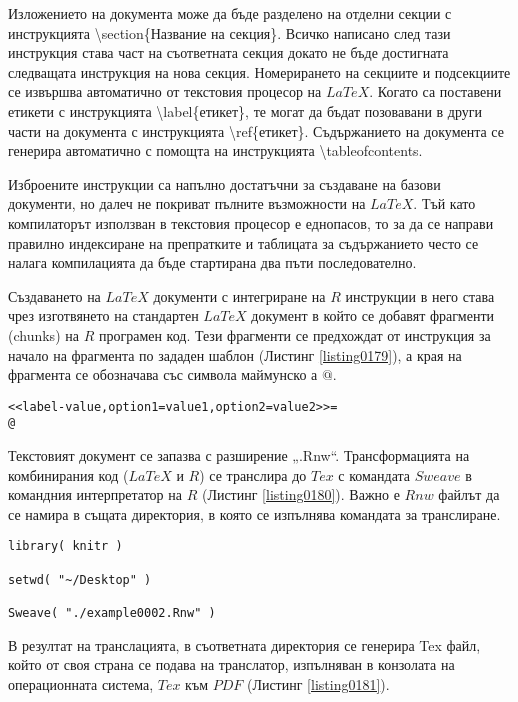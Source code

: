 Изложението на документа може да бъде разделено на отделни секции с инструкцията \textbackslash section\{Название на секция\}. Всичко написано след тази инструкция става част на съответната секция докато не бъде достигната следващата инструкция на нова секция. Номерирането на секциите и подсекциите се извършва автоматично от текстовия процесор на $LaTeX$. Когато са поставени етикети с инструкцията \textbackslash label\{етикет\}, те могат да бъдат позовавани в други части на документа с инструкцията \textbackslash ref\{етикет\}. Съдържанието на документа се генерира автоматично с помощта на инструкцията \textbackslash tableofcontents.

Изброените инструкции са напълно достатъчни за създаване на базови документи, но далеч не покриват пълните възможности на $LaTeX$. Тъй като компилаторът използван в текстовия процесор е еднопасов, то за да се направи правилно индексиране на препратките и таблицата за съдържанието често се налага компилацията да бъде стартирана два пъти последователно. 

Създаването на $LaTeX$ документи с интегриране на $R$ инструкции в него става чрез изготвянето на стандартен $LaTeX$ документ в който се добавят фрагменти (chunks) на $R$ програмен код. Тези фрагменти се предхождат от инструкция за начало на фрагмента по зададен шаблон (Листинг \ref{listing0179}), а края на фрагмента се обозначава със символа маймунско а $@$.

\begin{lstlisting}[caption=Инструкция за R фрагмент в LaTeX документ, label=listing0179]
<<label-value,option1=value1,option2=value2>>=
@
\end{lstlisting}

Текстовият документ се запазва с разширение „.Rnw“. Трансформацията на комбинирания код ($LaTeX$ и $R$) се транслира до $Tex$ с командата $Sweave$ в командния интерпретатор на $R$ (Листинг \ref{listing0180}). Важно е $Rnw$ файлът да се намира в същата директория, в която се изпълнява командата за транслиране. 

\begin{lstlisting}[caption=Транслиране от Rnw до Tex, label=listing0180]
library( knitr )

setwd( "~/Desktop" )

Sweave( "./example0002.Rnw" )
\end{lstlisting}

В резултат на транслацията, в съответната директория се генерира Tex файл, който от своя страна се подава на транслатор, изпълняван в конзолата на операционната система, $Tex$ към $PDF$ (Листинг \ref{listing0181}).

